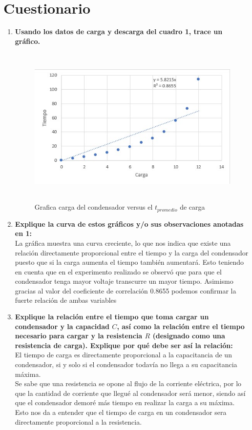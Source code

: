 \section{Cuestionario}
\begin{enumerate}
	\item \textbf{Usando los datos de carga y descarga del cuadro 1, trace un gráfico.}
	\begin{figure}[h]
		\centering
		\includegraphics[height= 8cm, width=12cm]{imagenes/grafico}
		\caption{Grafica carga del condensador versus el $t_{promedio}$ de carga}
	\end{figure}
	\item \textbf{Explique la curva de estos gráficos y/o sus observaciones anotadas en 1:}\\
	La gráfica muestra una curva creciente, lo que nos indica que existe una relación directamente proporcional entre el tiempo y la carga del condensador puesto que si la carga aumenta el tiempo también aumentará. Esto teniendo en cuenta que en el experimento realizado se observó que para que el condensador tenga mayor voltaje transcurre un mayor tiempo. Asimismo gracias al valor del coeficiente de correlación 0.8655  podemos confirmar la fuerte relación de ambas variables
	\item \textbf{Explique la relación entre el tiempo que toma cargar un condensador y la capacidad $C$, así como la relación entre el tiempo necesario para cargar y la resistencia $R$ (designado como una resistencia de carga). Explique por qué debe ser así la relación:\\}
	El tiempo de carga es directamente proporcional a la capacitancia de un condensador, si y solo si el condensador todavía no llega a su capacitancia máxima. \\
	Se sabe que una resistencia se opone al flujo de la corriente eléctrica, por lo que la cantidad de corriente que llegué al condensador será menor, siendo así que el condensador demoré más tiempo en  realizar la carga a su máxima. Esto nos da a entender que el tiempo de carga en un condensador sera directamente proporcional a la resistencia.	\\

\end{enumerate}
